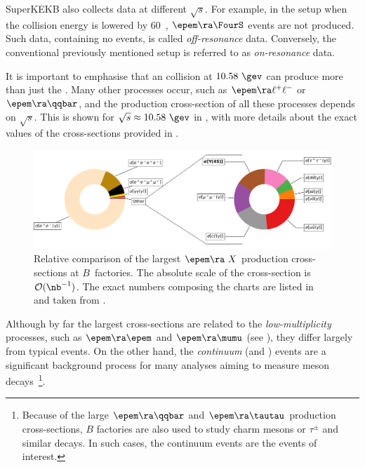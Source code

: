 SuperKEKB also collects data at different $\sqrt{s}$.
For example, in the setup when the collision energy is lowered by 60~\mev, $\epem\ra\FourS$ events are not produced.
Such data, containing no \FourS events, is called \textit{off-resonance} data.
Conversely, the conventional previously mentioned setup is referred to as \textit{on-resonance} data.

It is important to emphasise that an \epem collision at $10.58~\gev$ can produce more than just the \FourS.
Many other processes occur, such as $\epem\ra\ell^+\ell^-$ or $\epem\ra\qqbar$, and the production 
cross-section of all these processes depends on $\sqrt{s}$.
This is shown for \mbox{$\sqrt{s}\approx10.58~\gev$} in , with more details about the exact values of the cross-sections provided in .
\begin{figure}[htbp!]
    \includegraphics[width=1\textwidth]{figures/experimental_setup/corss_sections.pdf}
    \caption{\label{fig:cross_sections} Relative comparison of the largest $\epem\ra\ X$ production cross-sections at $B$~factories.
    The absolute scale of the cross-section is $\mathcal{O}(\nb^{-1})$.
    The exact numbers composing the charts are listed in  and taken from \cite{Belle-II:2018jsg}.
    }
\end{figure}

Although by far the largest cross-sections are related to the \textit{low-multiplicity} processes, 
such as \mbox{$\epem\ra\epem$} and \mbox{$\epem\ra\mumu$} (see ),
they differ largely from typical \mbox{\FourS\ra\BB} events.
On the other hand, the \textit{continuum} (\epem\ra\qqbar and \epem\ra\tautau) 
events are a significant background process for many analyses aiming to measure \B meson decays~\footnote{Because of the large $\epem\ra\qqbar$ and $\epem\ra\tautau$ production cross-sections, 
$B$ factories are also used to study charm mesons or $\tau^{\pm}$ and similar decays. 
In such cases, the continuum events are the events of interest.}.

